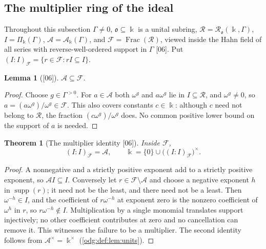 \documentclass[11pt,oneside]{article}
\numberwithin{equation}{section}
\newtheorem{theorem}{Theorem}[section]
\newtheorem{lemma}[lemma]{Lemma}
\theoremstyle{definition}
\theoremstyle{remark}
\newcommand{\supp}{\operatorname{supp}}
\newcommand{\Frac}{\operatorname{Frac}}
\newcommand{\src}[1]{\textup{\textsf{\small[#1]}}}
\begin{document}
\subsection{The multiplier ring of the ideal}

Throughout this subsection $\Gamma\ne0$, $\mathfrak o\subseteq\Bbbk$ is a
unital subring, $\mathcal R=\mathcal R_{\mathfrak o}(\Bbbk,\Gamma)$,
$I=\Pi_\Bbbk(\Gamma)$, $\mathcal A=\mathcal A_\Bbbk(\Gamma)$, and
$\mathcal F=\Frac(\mathcal R)$, viewed inside the Hahn field of all series with
reverse-well-ordered support in $\Gamma$ \src{06}. Put
$(I:I)_{\mathcal F}=\{r\in\mathcal F:rI\subseteq I\}$.

\begin{lemma}[\src{06}]\label{odg:def:lem:ainfrac}
$\mathcal A\subseteq\mathcal F$.
\end{lemma}
\begin{proof}
Choose $g\in\Gamma^{>0}$. For $a\in\mathcal A$ both $\omega^g$ and $a\omega^g$
lie in $I\subseteq\mathcal R$, and $\omega^g\ne0$, so
$a=(a\omega^g)/\omega^g\in\mathcal F$. This also covers constants
$c\in\Bbbk$: although $c$ need not belong to $\mathcal R$, the fraction
$(c\omega^g)/\omega^g$ does. No common positive lower bound on the support
of $a$ is needed.
\end{proof}

\begin{theorem}[The multiplier identity \src{06}]\label{odg:def:thm:multiplier}
Inside $\mathcal F$,
\begin{equation}\label{odg:def:eq:multiplier}
 (I:I)_{\mathcal F}=\mathcal A,\qquad
 \Bbbk=\{0\}\cup\bigl((I:I)_{\mathcal F}\bigr)^\times .
\end{equation}
\end{theorem}
\begin{proof}
A nonnegative and a strictly positive exponent add to a strictly positive
exponent, so $\mathcal AI\subseteq I$. Conversely let
$r\in\mathcal F\setminus\mathcal A$ and choose a negative exponent $h$ in
$\supp(r)$; it need not be the least, and there need not be a least. Then
$\omega^{-h}\in I$, and the coefficient of $r\omega^{-h}$ at exponent zero is
the nonzero coefficient of $\omega^h$ in $r$, so $r\omega^{-h}\notin I$.
Multiplication by a single monomial translates support injectively; no
other coefficient contributes at zero and no cancellation can remove it.
This witnesses the failure to be a multiplier. The second identity follows
from $\mathcal A^\times=\Bbbk^\times$
(\cref{odg:def:lem:units}).
\end{proof}
\end{document}
